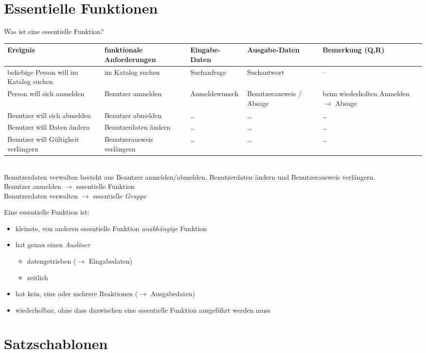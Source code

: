 
\section{Essentielle Funktionen}
Was ist eine essentielle Funktion?\\
\begin{tabular}{L{.2} | L{.2} | L{.15} | L{.15} | L{.25}}
Ereignis & funktionale Anforderungen & Eingabe-Daten & Ausgabe-Daten &Bemerkung (Q,R)\\
\hline\hline
beliebige Person will im Katalog suchen & im Katalog suchen & Suchanfrage & Suchantwort & --\\\hline
Person will sich anmelden & Benutzer anmelden & Anmeldewunsch & Benutzerausweis / Absage & beim wiederholten Anmelden $\to$ Absage\\\hline
Benutzer will sich abmelden & Benutzer abmelden & … & … & …\\\hline
Benutzer will Daten ändern & Benutzerdaten ändern & … & … & …\\\hline
Benutzer will Gültigkeit verlängern & Benutzerausweis verlängern & … & … & …
\end{tabular}\\
Benutzerdaten verwalten besteht aus Benutzer anmelden/abmelden, Benutzerdaten ändern und Benutzerausweis verlängern.\\
Benutzer anmelden $\to$ essentielle Funktion\\
Benutzerdaten verwalten $\to$ essentielle \emph{Gruppe}\\\bigskip

Eine essentielle Funktion ist:
\begin{itemize}
\item kleinste, von anderen essentielle Funktion \emph{unabhängige} Funktion
\item hat genau einen \emph{Auslöser}
\begin{itemize}
\item datengetrieben ($\to$ Eingabedaten)
\item zeitlich
\end{itemize}
\item hat kein, eine oder mehrere Reaktionen ($\to$ Ausgabedaten)
\item wiederholbar, ohne dass dazwischen eine essentielle Funktion ausgeführt werden muss
\end{itemize}

\section{Satzschablonen}
